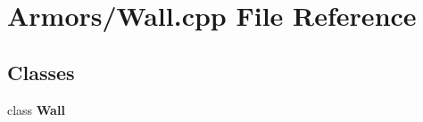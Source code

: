 \section{Armors/\-Wall.cpp File Reference}
\label{_wall_8cpp}
\subsection*{Classes}
\begin{DoxyCompactItemize}
\item 
class {\bf Wall}
\end{DoxyCompactItemize}
